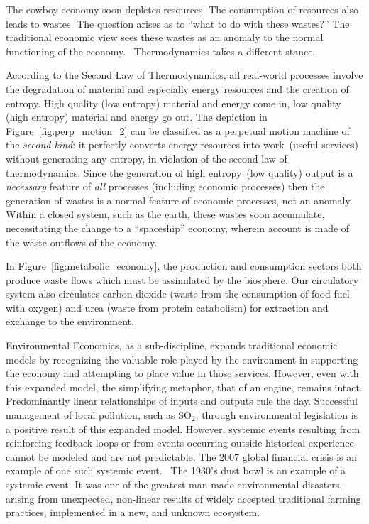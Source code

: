 The cowboy economy soon depletes resources.
The consumption of resources also leads to wastes.
The question arises as to ``what to do with these wastes?''
The traditional economic view sees these wastes as
an anomaly to the normal functioning of the economy.~\cite{Ayres1969}
Thermodynamics takes a different stance.

According to the Second Law of Thermodynamics,
all real-world processes involve the degradation
of material and especially energy resources
and the creation of entropy.
High quality (low entropy) material and energy come in,
low quality (high entropy) material and energy go out.
The depiction in Figure~\ref{fig:perp_motion_2} 
can be classified as a perpetual motion machine
of the \emph{second kind}:
it perfectly converts energy resources into 
work~(useful services) without generating
any entropy,
in violation of the second law of thermodynamics.
Since the generation of high entropy~(low quality)
output is a \emph{necessary} feature of \emph{all} processes 
(including economic processes)
then the generation of wastes is a normal feature of
economic processes,
not an anomaly.
Within a closed system, such as the earth,
these wastes soon accumulate,
necessitating the change to a ``spaceship'' economy,
wherein account is made of the waste outflows of
the economy.

In Figure~\ref{fig:metabolic_economy},
the production and consumption sectors both produce
waste flows which must be assimilated by the biosphere.
Our circulatory system also circulates carbon dioxide
(waste from the consumption of food-fuel with oxygen)
and urea (waste from protein catabolism) for extraction
and exchange to the environment.

Environmental Economics, as a sub-discipline, 
expands traditional economic models by recognizing the
valuable role played by the environment in supporting the 
economy and attempting to place value in those services.
However, even with this expanded model, 
the simplifying metaphor,
that of an engine,
remains intact. 
Predominantly linear relationships of inputs and outputs rule the day. 
Successful management of  local pollution, such as SO$_2$, 
through environmental legislation
is a positive result of this expanded model.
However, systemic events resulting from reinforcing feedback loops 
or from events occurring outside historical experience 
cannot be modeled and are not predictable. 
The 2007 global financial crisis is an example of one such systemic event.~\cite{Economist2010}
The 1930's dust bowl is an example of a systemic event. 
It was one of the greatest man-made environmental disasters, 
arising from unexpected, non-linear 
results of widely accepted traditional farming practices, 
implemented in a new, and unknown ecosystem.~\cite{Lockertz1978} 

